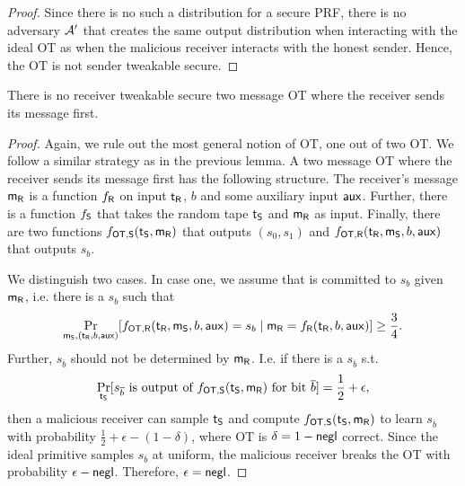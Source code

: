 \begin{proof}
Since there is no such a distribution for a secure PRF, there is no adversary $\mathcal{A}'$ that creates the same output distribution when interacting with the ideal OT as when the malicious receiver interacts with the honest sender. Hence, the OT is not sender tweakable secure. 
\end{proof}

\begin{lemma}
There is no receiver tweakable secure two message OT where the receiver sends its message first.
\end{lemma}

\begin{proof}
Again, we rule out the most general notion of OT, one out of two OT. We follow a similar strategy as in the previous lemma.
A two message OT where the receiver sends its message first has the following structure. The receiver's message $\mathsf{m}_{\mathsf{R}}$ is a function $f_{\mathsf{R}}$ on input $\mathsf{t}_{\mathsf{R}}$, $b$ and some auxiliary input $\mathsf{aux}$. Further, there is a function $f_{\mathsf{S}}$ that takes the random tape $\mathsf{t}_{\mathsf{S}}$ and $\mathsf{m}_{\mathsf{R}}$ as input. Finally, there are two functions $f_{\mathsf{OT},\mathsf{S}}(\mathsf{t}_{\mathsf{S}},\mathsf{m}_{\mathsf{R}})$ that outputs $(s_0,s_1)$ and $f_{\mathsf{OT},\mathsf{R}}(\mathsf{t}_{\mathsf{R}},\mathsf{m}_{\mathsf{S}},b,\mathsf{aux})$ that outputs $s_b$. 

We distinguish two cases. In case one,  we assume that \rec is committed to $s_b$ given $\mathsf{m}_{\mathsf{R}}$, i.e. there is a $s_b$ such that
$$
\Pr_{\mathsf{m}_{\mathsf{S}}, (\mathsf{t}_{\mathsf{R}},b,\mathsf{aux})}[f_{\mathsf{OT},\mathsf{R}}(\mathsf{t}_{\mathsf{R}},\mathsf{m}_{\mathsf{S}},b,\mathsf{aux})=s_b\mid \mathsf{m}_{\mathsf{R}}=f_{\mathsf{R}}(\mathsf{t}_{\mathsf{R}},b,\mathsf{aux})]\geq\frac{3}{4}.
$$
Further, $s_{\overline b}$ should not be determined by $\mathsf{m}_{\mathsf{R}}$. I.e. if there is a $s_{\overline b}$ s.t. 
$$
\Pr_{\mathsf{t}_{\mathsf{S}}}[s_{\overline b}\text{ is output of }f_{\mathsf{OT},\mathsf{S}}(\mathsf{t}_{\mathsf{S}},\mathsf{m}_{\mathsf{R}})\text{ for bit }\overline b]=\frac{1}{2}+\epsilon,
$$
then a malicious receiver can sample $\mathsf{t}_{\mathsf{S}}$ and compute $f_{\mathsf{OT},\mathsf{S}}(\mathsf{t}_{\mathsf{S}},\mathsf{m}_{\mathsf{R}})$ to learn $s_{\overline b}$ with probability $\frac{1}{2}+\epsilon-(1-\delta)$, where OT is $\delta=1-\mathsf{negl}$ correct. Since the ideal primitive samples $s_{\overline b}$ at uniform, the malicious receiver breaks the OT with probability $\epsilon-\mathsf{negl}$. Therefore, $\epsilon=\mathsf{negl}$. 


\end{proof}
